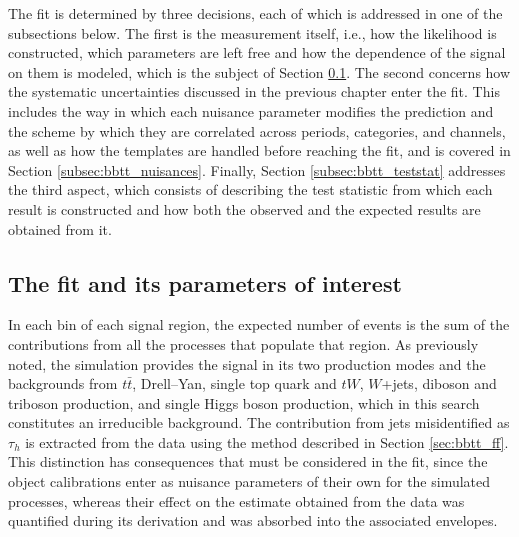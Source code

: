 The fit is determined by three decisions,  each of which is addressed in one of the subsections below. The first is the measurement itself, i.e., how the likelihood is constructed, which parameters are left free and how the dependence of the signal on them is modeled, which is the subject of Section \ref{subsec:bbtt_likelihood}. The second concerns how the systematic uncertainties discussed in the previous chapter enter the fit. This includes the way in which each nuisance parameter modifies the prediction and the scheme by which they are correlated across periods, categories, and channels, as well as how the templates are handled before reaching the fit, and is covered in Section \ref{subsec:bbtt_nuisances}. Finally, Section \ref{subsec:bbtt_teststat} addresses the third aspect, which consists of describing the test statistic from which each result is constructed and how both the observed and the expected results are obtained from it.


\subsection{The fit and its parameters of interest}
\label{subsec:bbtt_likelihood}
% 
In each bin of each signal region, the expected number of events is the sum of the contributions from all the processes that populate that region. As previously noted, the simulation provides the signal in its two production modes and the backgrounds from $t\bar{t}$, Drell--Yan, single top quark and $tW$, $W$+jets, diboson and triboson production, and single Higgs boson production, which in this search constitutes an irreducible background. The contribution from jets misidentified as $\tau_h$ is extracted from the data using the method described in Section \ref{sec:bbtt_ff}. This distinction has consequences that must be considered in the fit, since the object calibrations enter as nuisance parameters of their own for the simulated processes, whereas their effect on the estimate obtained from the data was quantified during its derivation and was absorbed into the associated envelopes.


